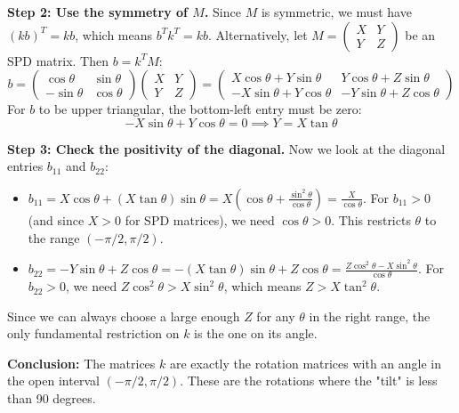 \begin{solution}
\textbf{Step 2: Use the symmetry of $M$.}
Since $M$ is symmetric, we must have $(kb)^T = kb$, which means $b^T k^T = kb$.
Alternatively, let $M = \begin{pmatrix} X & Y \\ Y & Z \end{pmatrix}$ be an SPD matrix.
Then $b = k^T M$:
\[ b = \begin{pmatrix} \cos \theta & \sin \theta \\ -\sin \theta & \cos \theta \end{pmatrix} \begin{pmatrix} X & Y \\ Y & Z \end{pmatrix} = \begin{pmatrix} X\cos \theta + Y\sin \theta & Y\cos \theta + Z\sin \theta \\ -X\sin \theta + Y\cos \theta & -Y\sin \theta + Z\cos \theta \end{pmatrix} \]
For $b$ to be upper triangular, the bottom-left entry must be zero:
\[ -X\sin \theta + Y\cos \theta = 0 \implies Y = X \tan \theta \]

\textbf{Step 3: Check the positivity of the diagonal.}
Now we look at the diagonal entries $b_{11}$ and $b_{22}$:
\begin{itemize}
    \item $b_{11} = X\cos \theta + (X \tan \theta)\sin \theta = X (\cos \theta + \frac{\sin^2 \theta}{\cos \theta}) = \frac{X}{\cos \theta}$.
    For $b_{11} > 0$ (and since $X > 0$ for SPD matrices), we need \textbf{$\cos \theta > 0$}. This restricts $\theta$ to the range $(-\pi/2, \pi/2)$.
    \item $b_{22} = -Y\sin \theta + Z\cos \theta = -(X \tan \theta)\sin \theta + Z\cos \theta = \frac{Z\cos^2 \theta - X\sin^2 \theta}{\cos \theta}$.
    For $b_{22} > 0$, we need $Z \cos^2 \theta > X \sin^2 \theta$, which means $Z > X \tan^2 \theta$.
\end{itemize}
Since we can always choose a large enough $Z$ for any $\theta$ in the right range, the only fundamental restriction on $k$ is the one on its angle.

\textbf{Conclusion:}
The matrices $k$ are exactly the rotation matrices with an angle in the open interval \textbf{$(-\pi/2, \pi/2)$}. These are the rotations where the "tilt" is less than 90 degrees.
\end{solution}

